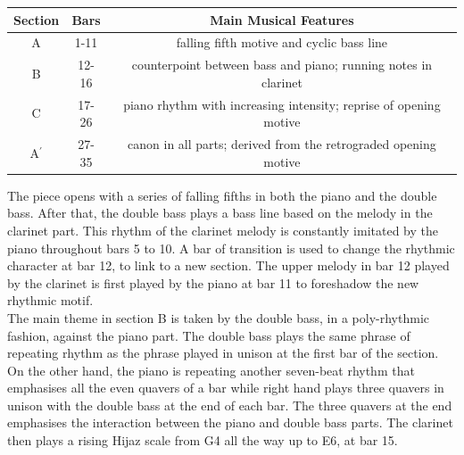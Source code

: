 \documentclass{article}
\begin{document}
\begin{center}
	\def\arraystretch{1.5}
\begin{tabular}{|c|c|c|}
	\hline
	Section&Bars&Main Musical Features\\
	\hline
	A&1-11&falling fifth motive and cyclic bass line\\
	\hline
	B&12-16&counterpoint between bass and piano; running notes in clarinet\\
	\hline
	C&17-26&piano rhythm with increasing intensity; reprise of opening motive\\
	\hline
	A\(^\prime\)&27-35&canon in all parts; derived from the retrograded opening motive\\
	\hline
\end{tabular}
\end{center}

The piece opens with a series of falling fifths in both the piano and the
double bass. After that, the double bass plays a bass line based on the melody
in the clarinet part. This rhythm of the clarinet melody is constantly imitated
by the piano throughout bars 5 to 10. A bar of transition is used to change the
rhythmic character at bar 12, to link to a new section. The upper melody in bar
12 played by the clarinet is first played by the piano at bar 11 to foreshadow
the new rhythmic motif.\\

The main theme in section B is taken by the double bass, in a poly-rhythmic
fashion, against the piano part. The double bass plays the same phrase of
repeating rhythm as the phrase played in unison at the first bar of the
section. On the other hand, the piano is repeating another seven-beat rhythm
that emphasises all the even quavers of a bar while right hand plays three
quavers in unison with the double bass at the end of each bar. The three
quavers at the end emphasises the interaction between the piano and double bass
parts. The clarinet then plays a rising Hijaz scale from G4 all the way up to
E6, at bar 15.\\
\end{document}
